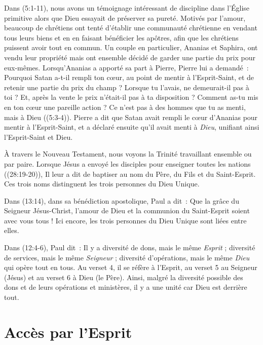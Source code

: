 Dans (5:1-11), nous avons un témoignage intéressant de
 discipline dans l'Église primitive alors que Dieu essayait de préserver
 sa pureté.
 Motivés par l'amour, beaucoup de chrétiens ont tenté d'établir une
 communauté chrétienne en vendant tous leurs biens et en en faisant
 bénéficier les apôtres, afin que les chrétiens puissent avoir tout en
 commun. Un couple en particulier, Ananias et Saphira, ont vendu leur
 propriété mais ont ensemble décidé de garder une partie du prix pour
 eux-mêmes. Lorsqu'Ananias a apporté sa part à Pierre, Pierre lui a
 demandé~: \og Pourquoi Satan a-t-il rempli ton cœur, au point de mentir
 à l'Esprit-Saint, et de retenir une partie du prix du champ ? Lorsque tu
 l'avais, ne demeurait-il pas à toi ? Et, après la vente le prix n'était-il
 pas à ta disposition ?
 Comment as-tu mis en ton cœur une pareille action ?
 Ce n'est pas à des hommes que tu as menti, mais à Dieu \fg{}
 ((5:3-4)).
 Pierre a dit que Satan avait rempli le cœur d'Ananias pour mentir
 à l'Esprit-Saint, et a déclaré ensuite qu'il avait menti à \emph{Dieu}, unifiant
 ainsi l'Esprit-Saint et Dieu.

À travers le Nouveau Testament, nous voyons la Trinité travaillant ensemble
 ou par paire. Lorsque Jésus a envoyé les disciples pour enseigner toutes
 les nations ((28:19-20)), Il leur a dit de baptiser au nom
 du Père, du Fils et du Saint-Esprit. Ces trois noms distinguent les trois
 personnes du Dieu Unique.

Dans (13:14), dans sa bénédiction apostolique, Paul a dit~:
 \og Que la grâce du Seigneur Jésus-Christ, l'amour de Dieu et la communion
 du Saint-Esprit soient avec vous tous ! \fg{}
 Ici encore, les trois personnes du Dieu Unique sont liées entre elles.

Dans (12:4-6), Paul dit~:
 \og Il y a diversité de dons, mais le même \emph{Esprit} ; diversité de services,
 mais le même \emph{Seigneur} ; diversité d'opérations, mais le
 même \emph{Dieu} qui opère tout en tous. \fg{}
 Au verset 4, il se réfère à l'Esprit, au verset 5 au Seigneur (Jésus)
 et au verset 6 à Dieu (le Père).
 Ainsi, malgré la diversité possible des dons et de leurs opérations
 et ministères, il y a une unité car Dieu est derrière tout.


\section*{Accès par l'Esprit}

